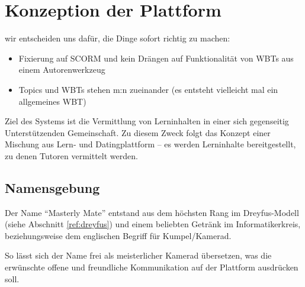 

\chapter{Konzeption der Plattform}\label{ref:chaptConcept}
\begin{k}
wir entscheiden uns dafür, die Dinge sofort richtig zu machen:
\begin{itemize}
  \item Fixierung auf SCORM und kein Drängen auf Funktionalität von WBTs aus
  einem Autorenwerkzeug
  \item Topics und WBTs stehen m:n zueinander (es entsteht vielleicht mal ein
  allgemeines WBT)
\end{itemize}
\end{k}
Ziel des Systems ist die Vermittlung von Lerninhalten in einer sich gegenseitig
Unterstützenden Gemeinschaft. Zu diesem Zweck folgt das Konzept einer Mischung
aus Lern- und Datingplattform -- es werden Lerninhalte bereitgestellt, zu denen
Tutoren vermittelt werden.

\section{Namensgebung}
Der Name "`Masterly Mate"' entstand aus dem höchsten Rang im Dreyfus-Modell
(siehe Abschnitt \ref{ref:dreyfus}) und einem beliebten Getränk im
Informatikerkreis, beziehungsweise dem englischen Begriff für Kumpel/Kamerad.

So lässt sich der Name frei als meisterlicher Kamerad übersetzen, was die
erwünschte offene und freundliche Kommunikation auf der Plattform ausdrücken
soll.

